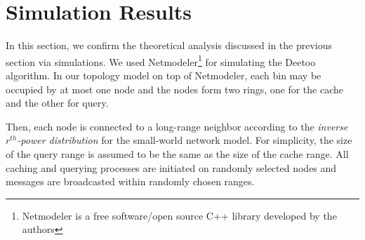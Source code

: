 \documentclass[9.5pt,journal,final,finalsubmission,twocolumn]{IEEEtran}
\begin{document}
\section{Simulation Results}\label{sec:simulation}
In this section, we confirm the theoretical analysis discussed in the previous 
section via simulations. 
We used Netmodeler\footnote{Netmodeler is a free software/open source
C++ library developed by the authors} for simulating the Deetoo algorithm.
In our topology model on top of Netmodeler, 
each bin may be occupied by at most one node and the nodes form two rings,
one for the cache 
and the other for query.

%
Then, each node is connected to a long-range neighbor according
to the \emph{inverse $r^{th}$-power distribution} for the small-world network model. 
For simplicity, the size of the query range is assumed to be the same as the size of the cache 
range. All caching and querying processes are initiated on randomly selected nodes and
messages are broadcasted within randomly chosen ranges.
\end{document}
